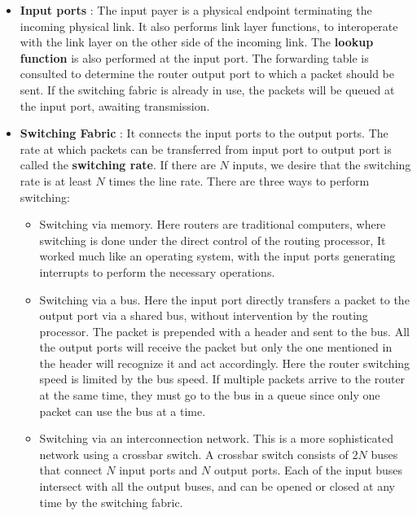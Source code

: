\documentclass[12pt,letterpaper]{book}
\theoremstyle{definition}
\begin{document}
\begin{itemize}
  \item \textbf{Input ports} : The input payer is a physical endpoint terminating the incoming physical link. It also performs link layer functions, to interoperate with the link layer on the other side of the incoming link. The \textbf{lookup function}  is also performed at the input port. The forwarding table is consulted to determine the router output port to which a packet should be sent. If the switching fabric is already in use, the packets will be queued at the input port, awaiting transmission.
  \item \textbf{Switching Fabric} : It connects the input ports to the output ports. The rate at which packets can be transferred from input port to output port is called the \textbf{switching rate}. If there are $N$ inputs, we desire that the switching rate is at least $N$ times the line rate. There are three ways to perform switching:
    \begin{itemize}
      \item Switching via memory. Here routers are traditional computers, where switching is done under the direct control of the routing processor, It worked much like an operating system, with the input ports generating interrupts to perform the necessary operations.
      \item Switching via a bus. Here the input port directly transfers a packet to the output port via a shared bus, without intervention by the routing processor. The packet is prepended with a header and sent to the bus. All the output ports will receive the packet but only the one mentioned in the header will recognize it and act accordingly. Here the router switching speed is limited by the bus speed. If multiple packets arrive to the router at the same time, they must go to the bus in a queue since only one packet can use the bus at a time.
      \item Switching via an interconnection network. This is a more sophisticated network using a crossbar switch. A crossbar switch consists of $2N$ buses that connect $N$ input ports and $N$ output ports. Each of the input buses intersect with all the output buses, and can be opened or closed at any time by the switching fabric.
    \end{itemize}

\end{itemize}
\end{document}
